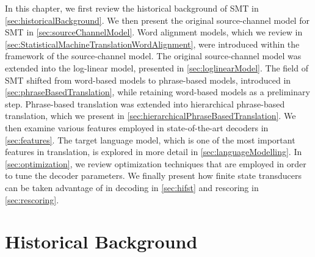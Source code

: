 In this chapter, we first review the historical background of SMT in
\autoref{sec:historicalBackground}.
We then present the original source-channel model for SMT
in \autoref{sec:sourceChannelModel}.
Word alignment models, which we review in
\autoref{sec:StatisticalMachineTranslationWordAlignment},
were introduced within the framework of the source-channel
model. The original source-channel model was extended into the log-linear
model, presented in \autoref{sec:loglinearModel}.
The field of SMT shifted from word-based models to phrase-based
models, introduced in \autoref{sec:phraseBasedTranslation}, while
retaining word-based models as a preliminary step.
Phrase-based translation was extended into hierarchical
phrase-based translation, which we present in
\autoref{sec:hierarchicalPhraseBasedTranslation}.
We then
examine various features employed in state-of-the-art decoders in
\autoref{sec:features}. The target language model, which
is one of the most important features in translation, is explored in
more detail in \autoref{sec:languageModelling}. In
\autoref{sec:optimization}, we review optimization techniques that
are employed in order to tune the decoder parameters. We finally present
how finite state transducers can be taken advantage of in decoding
in \autoref{sec:hifst} and rescoring in \autoref{sec:rescoring}.

\section{Historical Background}
\label{sec:historicalBackground}


